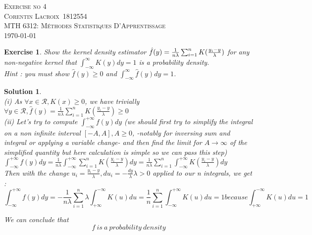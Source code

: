 \documentclass[12pt,a4paper]{article}
\def\StudentName{Corentin Lacroix}
\def\StudentMatricule{1812554}
\def\ExerciseNo{4}
\def\R{\mathcal{R}}%
\newtheorem{exercise}{Exercise}
\newtheorem{solution}{Solution}
\begin{document}
\begin{titlepage}
\begin{center}
\textsc{\LARGE Exercise no \ExerciseNo}\\[1.5cm]
\vspace{2in}
\textsc{\Large \StudentName~\StudentMatricule}\\[0.5cm]
\textsc{MTH 6312: Méthodes Statistiques D'Apprentissage}\\[0.5cm]
\today
\end{center}
\end{titlepage}

\begin{exercise}
Show the kernel density estimator $\hat f (y)={1\over n\lambda} \sum_{i=1}^n K({y_i-y\over \lambda })$ 
 for any non-negative kernel that $ \int_{-\infty}^\infty K(y)dy=1$ is a probability density. \\
 Hint : you must show $\hat f(y)\geq 0$ and $\int_{-\infty}^\infty \hat f(y)dy=1$.
\end{exercise}
\begin{solution}
\ \\
(i) As $\forall x \in  \R, K(x) \geq 0$, we have trivially $\forall y \in \R, \hat{f}(y) = \frac{1}{n\lambda} \sum_{i=1}^{n} K(\frac{y_i - y}{\lambda}) \geq 0$ \\

(ii) Let's try to compute $\int_{-\infty}^{+\infty}f(y)dy$ (we should first try to simplify the integral on a non infinite interval $[-A,A], A \geq 0$, -notably for inversing sum and integral or applying a variable change- and then find the limit for $A \rightarrow \infty$ of the simplified quantity but here calculation is simple so we can pass this step)\\

$\int_{-\infty}^{+\infty}f(y)dy = \frac{1}{n\lambda}\int_{-\infty}^{+\infty} \sum_{i=1}^n K(\frac{y_i-y}{\lambda})dy = \frac{1}{n\lambda} \sum_{i=1}^n \int_{-\infty}^{+\infty} K(\frac{y_i-y}{\lambda})dy$\\

Then with the change $u_i = \frac{y_i-y}{\lambda}, du_i = -\frac{dy}{\lambda} \lambda > 0$ applied to our n integrals, we get : $$\int_{-\infty}^{+\infty}f(y)dy = - \frac{1}{n\lambda} \sum_{i=1}^n \lambda \int_{+\infty}^{-\infty} K(u)du = \frac{1}{n} \sum_{i=1}^n \int_{-\infty}^{+\infty} K(u)du = 1 because \int_{+\infty}^{-\infty} K(u)du = 1$$

We can conclude that $$\boxed{f\ is\ a\ probability\ density}$$
\end{solution}
\end{document}
